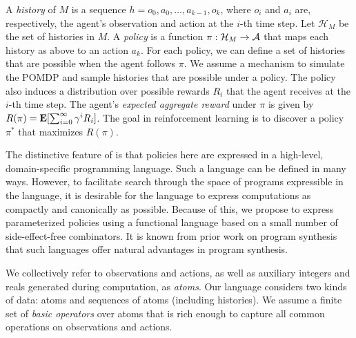 A {\em history} of $M$ is a sequence $h = o_0, a_0, \dots, a_{k-1}, o_k$, where $o_i$ and $a_i$ are, respectively, the agent's observation and action at the $i$-th time step. Let $\mathcal{H}_M$ be the set of histories in $M$. A {\em policy} is a function $\pi: \mathcal{H}_M \rightarrow \mathcal{A}$ that maps each history as above to an action $a_k$.
For each policy, we can define a set of histories that are possible when the agent follows $\pi$. We assume a mechanism to simulate the POMDP and sample histories that are possible under a policy.  
The policy also induces a distribution over possible rewards $R_i$ that the agent receives at the $i$-th time step. 
The agent's {\em expected aggregate reward} under $\pi$ is given by $R(\pi) = \mathbf{E}[\sum_{i = 0}^\infty \gamma^i R_i]$. The goal in reinforcement learning is to discover a policy $\pi^*$ that maximizes $R(\pi)$. 

 The distinctive feature of
\sygurl is that policies here are expressed in a high-level, domain-specific programming language. 
Such a language can be defined in many ways. However, to facilitate search through the space of programs expressible 
in the language, it is desirable for the language to express computations as compactly and canonically as possible. Because of this, we propose to express parameterized policies using a functional language based on a small number of side-effect-free combinators. It is known from prior work on program synthesis~\cite{DBLP:conf/pldi/FeserCD15} that such languages offer natural advantages in program synthesis.

We collectively refer to observations and actions, as well as auxiliary integers and reals generated during computation, as {\em atoms}. Our language considers two kinds of data: atoms and sequences of atoms (including histories). We assume a finite set of {\em basic operators} over atoms that is rich enough to capture all common operations on observations and actions. 
  
